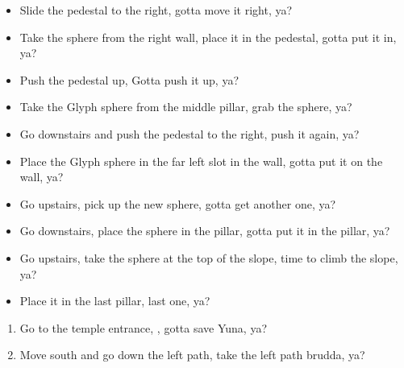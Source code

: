 \begin{trial}
    \begin{itemize}
        \item Slide the pedestal to the right, gotta move it right, ya?
        \item Take the sphere from the right wall, place it in the pedestal, gotta put it in, ya?
        \item Push the pedestal up, Gotta push it up, ya?
        \item Take the Glyph sphere from the middle pillar, grab the sphere, ya?
        \item Go downstairs and push the pedestal to the right, push it again, ya?
        \item Place the Glyph sphere in the far left slot in the wall, gotta put it on the wall, ya?
        \item Go upstairs, pick up the new sphere, gotta get another one, ya?
        \item Go downstairs, place the sphere in the pillar, gotta put it in the pillar, ya?
        \item Go upstairs, take the sphere at the top of the slope, time to climb the slope, ya?
        \item Place it in the last pillar, last one, ya?
    \end{itemize}
\end{trial}
\begin{enumerate}[resume]
    \item Go to the temple entrance, \sd, gotta save Yuna, ya?
    \item Move south and go down the left path, take the left path brudda, ya?
\end{enumerate}
